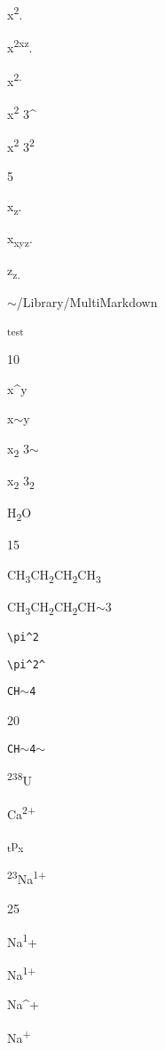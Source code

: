 
\def\mytitle{Superscript}


x\textsuperscript{2}.

x\textsuperscript{2xz}.

x\textsuperscript{2.}

x\textsuperscript{2} 3\^{}

x\textsuperscript{2} 3\textsuperscript{2}

5

x\textsubscript{z}.

x\textsubscript{xyz}.

z\textsubscript{z.}

\ensuremath{\sim}\slash Library\slash MultiMarkdown

\textsuperscript{test}

10

x\^{}y

x\ensuremath{\sim}y

x\textsubscript{2} 3\ensuremath{\sim}

x\textsubscript{2} 3\textsubscript{2}

H\textsubscript{2}O

15

CH\textsubscript{3}CH\textsubscript{2}CH\textsubscript{2}CH\textsubscript{3}

CH\textsubscript{3}CH\textsubscript{2}CH\textsubscript{2}CH\ensuremath{\sim}3

\texttt{\textbackslash{}pi\^{}2}

\texttt{\textbackslash{}pi\^{}2\^{}}

\texttt{CH\ensuremath{\sim}4}

20

\texttt{CH\ensuremath{\sim}4\ensuremath{\sim}}

\textsuperscript{238}U

Ca\textsuperscript{2+}

\textsubscript{t}p\textsubscript{x}

\textsuperscript{23}Na\textsuperscript{1+}

25

Na\textsuperscript{1}+

Na\textsuperscript{1+}

Na\^{}+

Na\textsuperscript{+}



